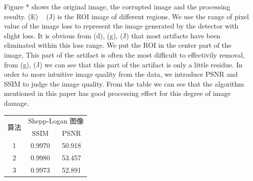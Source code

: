 \documentclass[hyperref]{ctexart}
\begin{document}
{\begin{multicols}{2}
		Figure * shows the original image, the corrupted image and the processing resulty. (E) ~ (J) is the ROI image of different regions. We use the range of pixel value of the image loss to represent the image generated by the detector with slight loss. It is obvious from (d), (g), (J) that most artifacts have been eliminated within this loss range. We put the ROI in the center part of the image, This part of the artifact is often the most difficult to effectivily removal, from (g), (J) we can see that this part of the artifact is only a little residue. In order to more intuitive image quality from the data, we introduce PSNR and SSIM to judge the image quality. From the table we can see that the algorithm mentioned in this paper has good processing effect for this degree of image damage.
		
		\begin{tabular}{ccc}
			\hline
			\multirow{2}{*}{算法} & \multicolumn{2}{c}{Shepp-Logan 图像}  \\
			& SSIM             & PSNR                 \\ \hline
			1                  & 0.9970                & 50.918                \\
			2                & 0.9980                & 53.457                \\
			3               & 0.9973                & 52.891                   \\ \hline
		\end{tabular}
		\end{multicols}
	
}
\end{document}
